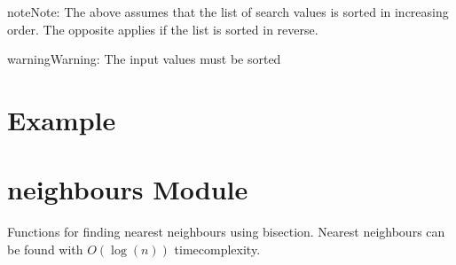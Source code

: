 \documentclass[letterpaper,10pt,english]{sphinxmanual}
\begin{document}
\begin{sphinxadmonition}{note}{Note:}
\sphinxAtStartPar
The above assumes that the list of search values is sorted in increasing order. The opposite applies if the
list is sorted in reverse.
\end{sphinxadmonition}

\begin{sphinxadmonition}{warning}{Warning:}
\sphinxAtStartPar
The input values must be sorted
\end{sphinxadmonition}


\section{Example}
\label{\detokenize{bisection:example}}
\begin{sphinxVerbatim}[commandchars=\\\{\}]
 

 \PYG{p}{[}\PYG{p}{]}  

   
   
   \PYG{p}{[}\PYG{p}{]}
\end{sphinxVerbatim}


\section{neighbours Module}
\label{\detokenize{bisection:module-geotrees.neighbours}}\label{\detokenize{bisection:neighbours-module}}
\sphinxAtStartPar
Functions for finding nearest neighbours using bisection. Nearest neighbours can
be found with \(O(\log(n))\) time\sphinxhyphen{}complexity.
\end{document}
